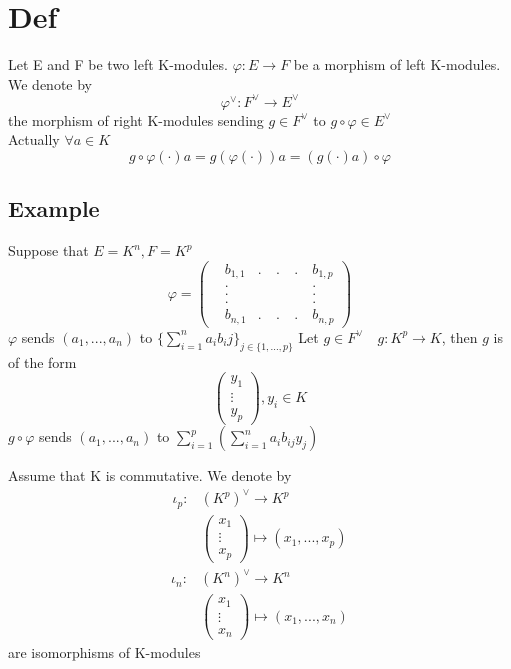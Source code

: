 \documentclass{book}
\begin{document}
\section{Def}
Let E and F be two left K-modules. $\varphi:E\rightarrow F$ be a morphism of left K-modules. We denote by $$\varphi^\vee:F^\vee\rightarrow E^\vee$$ the morphism of right K-modules sending $g\in F^\vee$ to $g\circ \varphi\in E^\vee$\\
Actually $\forall a\in K$$$g\circ\varphi(\cdot)a=g(\varphi(\cdot))a=(g(\cdot)a)\circ\varphi$$
\subsection{Example}
Suppose that $E=K^n,F=K^p$
$$\varphi=\left(\begin{aligned}
    &b_{1,1} &.\ &.\ &.\ &b_{1,p}\\ 
    & .& & & &.\\
    & .& & & &.\\
    & .& & & &.\\
    &b_{n,1} &.\ &.\ &.\  &b_{n,p}
\end{aligned}\right)$$ 
$\varphi$ sends $(a_1,...,a_n)$ to $\{\sum\limits_{i=1}^na_ib_ij\}_{j\in \{1,...,p\}}$
Let $g\in F^\vee\quad g:K^p\rightarrow K$, then $g$ is of the form $$\left(\begin{aligned}
    y_1\\\vdots\\y_p
\end{aligned}\right),y_i\in K$$
$g\circ \varphi$ sends $(a_1,...,a_n)$ to $\sum\limits_{i=1}^p(\sum\limits_{i=1}^na_ib_{ij}y_j)$

Assume that K is commutative. We denote by 
$$\begin{aligned}
    \iota_p:&(K^p)^\vee\rightarrow K^p\\
    &\left(\begin{aligned}
        x_1\\\vdots\\x_p
    \end{aligned}\right)\mapsto(x_1,...,x_p)
\end{aligned}$$
$$\begin{aligned}
    \iota_n:&(K^n)^\vee\rightarrow K^n\\
    &\left(\begin{aligned}
        x_1\\\vdots\\x_n
    \end{aligned}\right)\mapsto(x_1,...,x_n)
\end{aligned}$$are isomorphisms of K-modules
\end{document}
